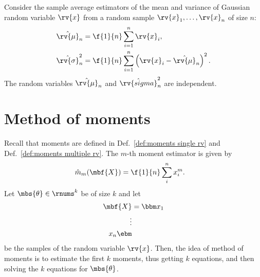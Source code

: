 \begin{mytheorem}
   Consider the sample average estimators of the mean and variance of Gaussian random variable $\rv{x}$ from a random sample $\rv{x}_{1},\ldots, \rv{x}_{n}$ of size $n$:
   \begin{align}
       \hat{\rv{\mu}}_{n} &= \f{1}{n}\sum_{i=1}^{n}\rv{x}_{i},\\
       \hat{\rv{\sigma}}_{n}^{2} &= \f{1}{n} \sum_{i=1}^{n}\left( \rv{x}_{i}-\hat{\rv{\mu}}_{n} \right)^{2}.
   \end{align}
   The random variables $\hat{\rv{\mu}}_{n}$ and $\hat{\rv{sigma}}_{n}^{2}$ are independent.
\end{mytheorem}

\section{Method of moments}
Recall that moments are defined in Def.~\ref{def:moments single rv} and Def.~\ref{def:moments multiple rv}. 
The $m$-th moment estimator is given by
\begin{align}
    \hat{m}_{m}(\mbf{X}) &= 
    \f{1}{n}\sum_{i}^{n}x_{i}^{m}.
\end{align}
Let $\mbs{\theta}\in\rnums^{k}$ be of size $k$ and let 
\begin{align}
    \mbf{X} &= \bbm x_{1} \\\vdots\\x_{n} \ebm 
\end{align}
be the samples of the random variable $\rv{x}$. Then, 
the idea of method of moments is to estimate the first $k$ moments, thus getting $k$ equations, and then solving the $k$ equations for $\mbs{\theta}$.

